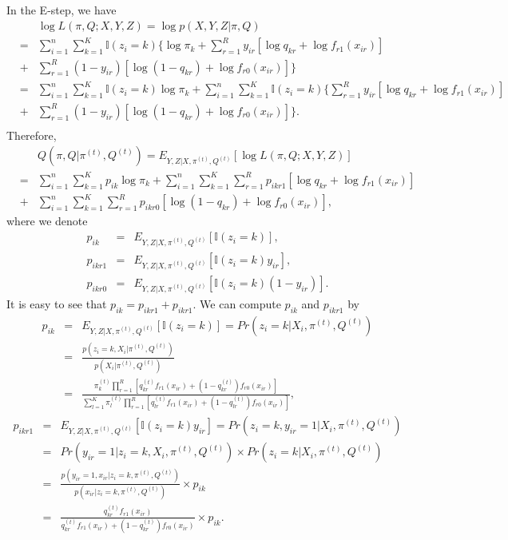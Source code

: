 \documentclass[11pt, oneside]{article}   	%
\begin{document}
In the E-step, we have
\begin{eqnarray*}
&&\log L(\pi,Q;X,Y,Z) = \log p(X,Y, Z|\pi,Q)  \\
&=&  \sum_{i=1}^n \sum_{k=1}^K \mathbb {I}(z_i=k) \{ \log \pi_k + \sum_{r=1}^R y_{ir}[\log q_{kr} + \log f_{r1}(x_{ir})] \\
& +&  \sum_{r=1}^R (1-y_{ir})[\log (1-q_{kr}) + \log f_{r0}(x_{ir})] \}  \\
&=& \sum_{i=1}^n \sum_{k=1}^K \mathbb {I}(z_i=k) \log \pi_k +  \sum_{i=1}^n \sum_{k=1}^K \mathbb {I}(z_i=k) \{ \sum_{r=1}^R y_{ir}[\log q_{kr} + \log f_{r1}(x_{ir})] \\
& +&  \sum_{r=1}^R (1-y_{ir})[\log (1-q_{kr}) + \log f_{r0}(x_{ir})] \}.  \\
\end{eqnarray*}
Therefore,
\begin{eqnarray}
&& Q(\pi,Q|\pi^{(t)}, Q^ {(t)})=E_{Y,Z|X,\pi^{(t)}, Q^ {(t)}}[\log L(\pi,Q;X,Y,Z)] \nonumber \\
&=& \sum_{i=1}^n \sum_{k=1}^K p_{ik} \log \pi_k +\sum_{i=1}^n \sum_{k=1}^K \sum_{r=1}^R p_{ikr1}[\log q_{kr} + \log f_{r1}(x_{ir})] \nonumber \\
&+& \sum_{i=1}^n \sum_{k=1}^K \sum_{r=1}^R p_{ikr0}[\log (1-q_{kr}) + \log f_{r0}(x_{ir})],
\label{eq:Q}
\end{eqnarray}
where we denote 
\begin{eqnarray*}
 p_{ik} &=& E_{Y,Z|X,\pi^{(t)}, Q^ {(t)}}[\mathbb {I}(z_i=k)], \\
 p_{ikr1} &=&E_{Y,Z|X,\pi^{(t)}, Q^ {(t)}}[ \mathbb {I}(z_i=k) y_{ir}], \\
  p_{ikr0} &=&E_{Y,Z|X,\pi^{(t)}, Q^ {(t)}}[ \mathbb {I}(z_i=k)(1-y_{ir})].
 \end{eqnarray*}
It is easy to see that $ p_{ik} = p_{ikr1}+p_{ikr1}$. We can compute $p_{ik}$ and $p_{ikr1}$ by
\begin{eqnarray}
p_{ik} &=& E_{Y,Z|X,\pi^{(t)}, Q^ {(t)}}[\mathbb {I}(z_i=k)]  = Pr(z_i=k|X_i,\pi^{(t)}, Q^ {(t)}) \nonumber\\
&=& \frac{p(z_i=k,X_i|\pi^{(t)}, Q^ {(t)})} {p(X_i|\pi^{(t)}, Q^ {(t)})} \nonumber\\
&=& \frac{ \pi_k^{(t)}\prod_{r=1}^R [q_{kr}^{(t)}f_{r1}(x_{ir})+(1-q_{kr}^{(t)})f_{r0}(x_{ir})] }{\sum_{l=1}^K \pi_l^{(t)}\prod_{r=1}^R [q_{lr}^{(t)}f_{r1}(x_{ir})+(1-q_{lr}^{(t)})f_{r0}(x_{ir})] },
\label{eq:ik}
\end{eqnarray}
\begin{eqnarray}
p_{ikr1} &=& E_{Y,Z|X,\pi^{(t)}, Q^ {(t)}}[ \mathbb {I}(z_i=k) y_{ir}]=Pr(z_i=k, y_{ir}=1|X_i,\pi^{(t)}, Q^ {(t)}) \nonumber\\
&=& Pr(y_{ir}=1|z_i=k, X_i,\pi^{(t)}, Q^ {(t)}) \times Pr(z_i=k|X_i,\pi^{(t)}, Q^ {(t)}) \nonumber\\
&=& \frac{p(y_{ir}=1,x_{ir}|z_i=k,\pi^{(t)}, Q^ {(t)})} {p(x_{ir}|z_i=k, \pi^{(t)}, Q^ {(t)})}\times p_{ik} \nonumber \\
&=& \frac{q_{kr}^{(t)}f_{r1}(x_{ir})}{q_{kr}^{(t)}f_{r1}(x_{ir})+(1-q_{kr}^{(t)})f_{r0}(x_{ir})} \times p_{ik}.
\label{eq:ik1}
\end{eqnarray}
\end{document}
